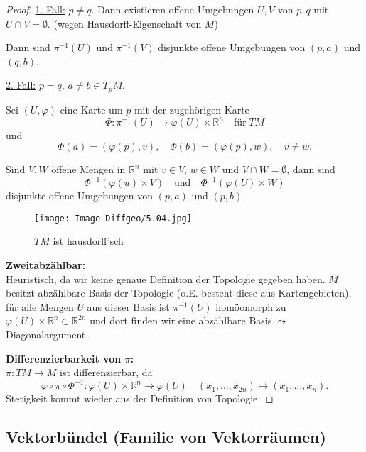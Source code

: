 \documentclass[fleqn, 12pt, letterpaper]{article}
\begin{document}
\begin{proof}
\vspace{1em}

\underline{1. Fall:} \(p \neq q\).  
Dann existieren offene Umgebungen \(U,V\) von \(p,q\) mit $U\cap V=\emptyset$. (wegen Hausdorff-Eigenschaft von $M$)

Dann sind $\pi^{-1}(U)$ und $\pi^{-1}(V)$ disjunkte offene Umgebungen von \((p,a)\) und \((q,b)\).

\vspace{1em}

\underline{2. Fall:} \(p=q\), \(a \neq b \in T_p M\).

Sei \((U,\varphi)\) eine Karte um \(p\) mit der zugehörigen Karte
\[
\Phi: \pi^{-1}(U) \to \varphi(U) \times \mathbb{R}^n \quad \text{für}\; TM
\]
und
\[
\Phi(a) = (\varphi(p),v), \quad \Phi(b) = (\varphi(p),w), \quad v \neq w.
\]

\vspace{1em}

Sind \(V,W\) offene Mengen in \(\mathbb{R}^n\) mit \(v \in V\), \(w \in W\) und \(V \cap W = \emptyset\), dann sind
\[
\Phi^{-1}(\varphi(u)\times V) \quad \text{und} \quad \Phi^{-1}(\varphi(U)\times W)
\]
disjunkte offene Umgebungen von \((p,a)\) und \((p,b)\).
  \begin{figure}[H]
    \centering
    \texttt{[image: Image Diffgeo/5.04.jpg]}
	\caption{$TM$ ist hausdorff'sch}
 \end{figure}

\textbf{Zweitabzählbar:} \\
Heuristisch, da wir keine genaue Definition der Topologie gegeben haben.
\(M\) besitzt abzählbare Basis der Topologie (o.E. besteht diese aus Kartengebieten), für alle Mengen \(U\) aus dieser Basis ist \(\pi^{-1}(U)\) homöomorph zu \(\varphi(U) \times \mathbb{R}^n \subset \mathbb{R}^{2n}\) und dort finden wir eine abzählbare Basis \(\leadsto\) Diagonalargument.

\vspace{1em}

\textbf{Differenzierbarkeit von \(\pi\):} \\
\(\pi: TM \to M\) ist differenzierbar, da
\[
\varphi\circ\pi\circ\Phi^{-1}:\varphi(U) \times \mathbb{R}^n \longrightarrow \varphi(U) \quad (x_1, \dotsc, x_{2n}) \mapsto (x_1, \dotsc, x_{n}).
\]
Stetigkeit kommt wieder aus der Definition von Topologie.
\end{proof}



\subsection{Vektorbündel (Familie von Vektorräumen)}
\end{document}

